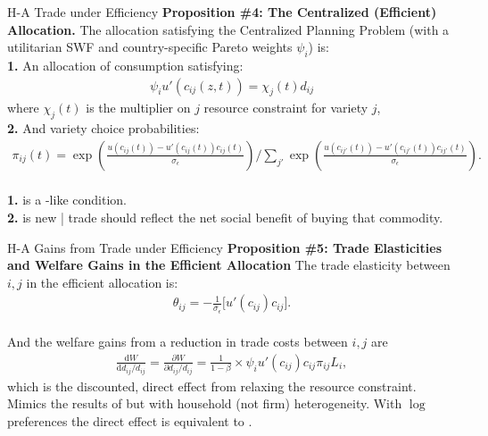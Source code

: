 \documentclass[9pt,pdftex,aspectratio=1610]{beamer}
\theoremstyle{definition}
\begin{document}
\begin{frame}[t]{H-A Trade under Efficiency}
\smallskip
\textbf{Proposition \#4: The Centralized (Efficient) Allocation.} The allocation satisfying the Centralized Planning Problem (with a utilitarian SWF and country-specific Pareto weights $\psi_i$) is:\\
\bigskip
\textbf{1.} An allocation of consumption satisfying:
\begin{align}
\psi_{i} u'(c_{ij}(z,t) ) = \chi_{j}(t) d_{ij} \nonumber
\end{align}
where $\chi_{j}(t)$ is the multiplier on $j$ resource constraint for variety $j$,\\
\bigskip
\medskip
\textbf{2.} And variety choice probabilities:
\begin{align}
\displaystyle \pi_{ij}(t) =\exp \left( \frac{u(c_{ij}(t)) - u'(c_{ij}(t))c_{ij}(t)}{\sigma_{\epsilon}}\right) \bigg / \sum_{j'}\exp \left( \frac{u(c_{ij'}(t)) - u'(c_{ij'}(t))c_{ij'}(t)}{\sigma_{\epsilon}} \right). \nonumber
\end{align}\\
\bigskip
\medskip
\textbf{1.} is a \citet{backus1993}-like condition. \\
\smallskip
\textbf{2.} is new | trade should reflect the net social benefit of buying that commodity.
\end{frame}

\begin{frame}[t]{H-A Gains from Trade under Efficiency}
\smallskip
\textbf{Proposition \#5: Trade Elasticities and Welfare Gains in the Efficient Allocation} The trade elasticity between $i,j$ in the efficient allocation is:
\begin{align}
\theta_{ij} =  -\frac{1}{\sigma_{\epsilon}} \bigg [ u'(c_{ij}) c_{ij} \bigg]. \nonumber
\end{align}\\
\bigskip
And the welfare gains from a reduction in trade costs between $i,j$ are
\begin{align}
\frac{\mathrm{d} W}{\mathrm{d} d_{ij} / d_{ij}} = \frac{\partial W}{\partial d_{ij} / d_{ij}} = \frac{1}{1-\beta} \times \psi_{i} u'(c_{ij}) c_{ij} \pi_{ij} L_i, \nonumber
\end{align}
which is the discounted, direct effect from relaxing the resource constraint.\\
\bigskip
\medskip
Mimics the results of \citet{AtkesonBurstein2010} but with household (not firm) heterogeneity. With $\log$ preferences the direct effect is equivalent to \citet{arkolakis2012new}.\\
\bigskip

\end{frame}
\end{document}
